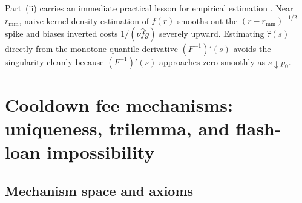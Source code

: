 Part~(ii) carries an immediate practical lesson for empirical estimation \citep{companion2026}. Near $r_{\min}$, naive kernel density estimation of $f(r)$ smooths out the $(r - r_{\min})^{-1/2}$ spike and biases inverted costs $1/(\nu \hat{f}\tilde{g})$ severely upward. Estimating $\hat{\tau}(s)$ directly from the monotone quantile derivative $(F^{-1})'(s)$ avoids the singularity cleanly because $(F^{-1})'(s)$ approaches zero smoothly as $s \downarrow p_0$.

\section{Cooldown fee mechanisms: uniqueness, trilemma, and flash-loan impossibility}\label{sec:cooldown}

\subsection{Mechanism space and axioms}\label{subsec:axioms}


